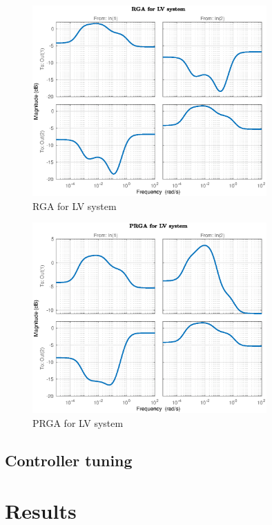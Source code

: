 \documentclass[12pt]{article}
\begin{document}
\begin{figure}[p]
\centering
\includegraphics[width=0.8\textwidth]{../Systemanalyse/Log_Data_to_Matlab/Figurer/LV_identifisering/LV_RGA.eps}
\caption{RGA for LV system}
\label{fig:LV_RGA}
\end{figure}

\begin{figure}[p]
\centering
\includegraphics[width=0.8\textwidth]{../Systemanalyse/Log_Data_to_Matlab/Figurer/LV_identifisering/LV_PRGA.eps}
\caption{PRGA for LV system}
\label{fig:LV_PRGA}
\end{figure}

\subsection{Controller tuning}


\newpage
\section{Results}
\end{document}
